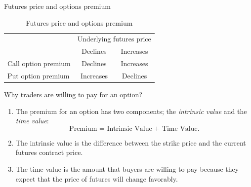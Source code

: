 \documentclass[table,xcolor=pdftex,dvipsnames]{beamer}\usepackage[]{graphicx}\usepackage[]{color}
\begin{document}

\begin{frame}{Futures price and options premium}
\begin{table}
\caption{Futures price and options premium}
\scriptsize
\begin{tabular}{l c c }
  \toprule
    & \multicolumn{2}{c}{Underlying futures price} \\
  \cmidrule(r){2-3}
    & Declines & Increases \\
  \midrule
  Call option premium & Declines & Increases\\
  \addlinespace[0.075in]
  Put option premium & Increases & Declines \\
  \bottomrule
\end{tabular}
\end{table}
\end{frame}



\begin{frame}{Why traders are willing to pay for an option?}
\begin{enumerate}[label=\textbullet]
  \item The premium for an option has two components; the \emph{intrinsic value} and the \emph{time value}: \[ \text{Premium = Intrinsic Value + Time Value}. \]
  \vspace{-\baselineskip}
  \item The intrinsic value is the difference between the strike price and the current futures contract price.
  \item The time value is the amount that buyers are willing to pay because they expect that the price of futures will change favorably.
\end{enumerate}
\end{frame}

\end{document}
